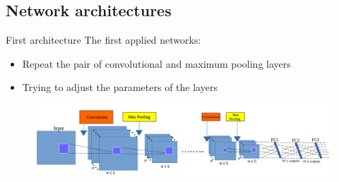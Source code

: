 \documentclass[10pt,svgnames]{beamer}
\begin{document}
\subsection{Network architectures}
\begin{frame}{First architecture}{}
	The first applied networks:
	\begin{itemize}
		\item Repeat the pair of {\color{conv}convolutional} and {\color{pool}maximum pooling} layers
		\item Trying to adjust the parameters of the layers
	\end{itemize}
	\begin{center}
   		\begin{figure}[htbp]
   			\centering
    		\includegraphics[scale=.28]{images/arch_cnn2}    
		\end{figure}
   \end{center}
\end{frame}
\end{document}
